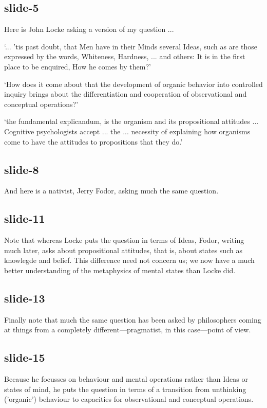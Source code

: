 \documentclass[12pt,\papersize]{extarticle}
\begin{document}
\subsection{slide-5}
Here is John Locke asking a version of my question ...
 
‘... ’tis past doubt, that Men have in their Minds several Ideas, such as are those expressed by the words, Whiteness, Hardness, ... and others: It is in the first place to be enquired, How he comes by them?’
\citep[p.\ 104]{Locke:1975qo}
\citep[p.\ 104]{Locke:1975qo}
 
‘How does it come about that the development of organic behavior into controlled inquiry brings about the differentiation and cooperation of observational and conceptual operations?’
\citep[p.\ 12]{Dewey:1938yp}
\citep[p.\ 12]{Dewey:1938yp}
 
‘the fundamental explicandum, is the organism and its propositional attitudes ... Cognitive psychologists accept ... the ... necessity of explaining how organisms come to have the attitudes to propositions that they do.’
\citep[p.\ 198]{Fodor:1975pb}
\citep[p.\ 198]{Fodor:1975pb}
 
 
 
\subsection{slide-8}
And here is a nativist, Jerry Fodor, asking much the same question.
 
 
 
\subsection{slide-11}
Note that whereas Locke puts the question in terms of Ideas, Fodor, writing much later, asks about propositional attitudes, that is, about states such as knowlegde and belief. This difference need not concern us; we now have a much better understanding of the metaphysics of mental states than Locke did.
 
 
 
\subsection{slide-13}
Finally note that much the same question has been asked by philosophers coming at things from a completely different---pragmatist, in this case---point of view.
 
 
 
\subsection{slide-15}
Because he focusses on behaviour and mental operations rather than Ideas or states of mind, he puts the question in terms of a transition from unthinking ('organic') behaviour to capacities for observational and conceptual operations.
 
\end{document}
